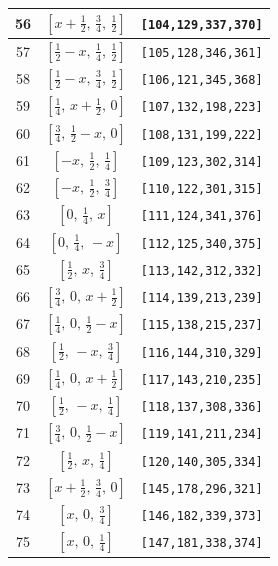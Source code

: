 \documentclass[fleqn,8pt]{jsarticle}
\begin{document}
\begin{longtable}{ccc}
56 & $\left[ x + \frac{1}{2},\, \frac{3}{4},\, \frac{1}{2} \right]$ & {\tt [104,129,337,370]} \\ \hline
57 & $\left[ \frac{1}{2} - x,\, \frac{1}{4},\, \frac{1}{2} \right]$ & {\tt [105,128,346,361]} \\ \hline
58 & $\left[ \frac{1}{2} - x,\, \frac{3}{4},\, \frac{1}{2} \right]$ & {\tt [106,121,345,368]} \\ \hline
59 & $\left[ \frac{1}{4},\, x + \frac{1}{2},\, 0 \right]$ & {\tt [107,132,198,223]} \\ \hline
60 & $\left[ \frac{3}{4},\, \frac{1}{2} - x,\, 0 \right]$ & {\tt [108,131,199,222]} \\ \hline
61 & $\left[ - x,\, \frac{1}{2},\, \frac{1}{4} \right]$ & {\tt [109,123,302,314]} \\ \hline
62 & $\left[ - x,\, \frac{1}{2},\, \frac{3}{4} \right]$ & {\tt [110,122,301,315]} \\ \hline
63 & $\left[ 0,\, \frac{1}{4},\, x \right]$ & {\tt [111,124,341,376]} \\ \hline
64 & $\left[ 0,\, \frac{1}{4},\, - x \right]$ & {\tt [112,125,340,375]} \\ \hline
65 & $\left[ \frac{1}{2},\, x,\, \frac{3}{4} \right]$ & {\tt [113,142,312,332]} \\ \hline
66 & $\left[ \frac{3}{4},\, 0,\, x + \frac{1}{2} \right]$ & {\tt [114,139,213,239]} \\ \hline
67 & $\left[ \frac{1}{4},\, 0,\, \frac{1}{2} - x \right]$ & {\tt [115,138,215,237]} \\ \hline
68 & $\left[ \frac{1}{2},\, - x,\, \frac{3}{4} \right]$ & {\tt [116,144,310,329]} \\ \hline
69 & $\left[ \frac{1}{4},\, 0,\, x + \frac{1}{2} \right]$ & {\tt [117,143,210,235]} \\ \hline
70 & $\left[ \frac{1}{2},\, - x,\, \frac{1}{4} \right]$ & {\tt [118,137,308,336]} \\ \hline
71 & $\left[ \frac{3}{4},\, 0,\, \frac{1}{2} - x \right]$ & {\tt [119,141,211,234]} \\ \hline
72 & $\left[ \frac{1}{2},\, x,\, \frac{1}{4} \right]$ & {\tt [120,140,305,334]} \\ \hline
73 & $\left[ x + \frac{1}{2},\, \frac{3}{4},\, 0 \right]$ & {\tt [145,178,296,321]} \\ \hline
74 & $\left[ x,\, 0,\, \frac{3}{4} \right]$ & {\tt [146,182,339,373]} \\ \hline
75 & $\left[ x,\, 0,\, \frac{1}{4} \right]$ & {\tt [147,181,338,374]} \\ \hline

\end{longtable}
\end{document}
